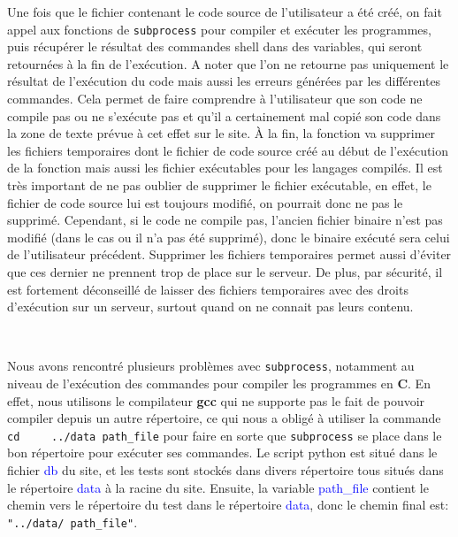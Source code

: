 \documentclass[a4paper]{article}
\renewcommand{\texttt}[2][blue]{\textcolor{#1}{\ttfamily #2}}
\begin{document}
  Une fois que le fichier contenant le code source de l'utilisateur a été créé,
  on fait appel aux fonctions de \lstinline{subprocess} pour compiler et
  exécuter les programmes, puis récupérer le résultat des commandes shell dans
  des variables, qui seront retournées à la fin de l'exécution. A noter que
  l'on ne retourne pas uniquement le résultat de l'exécution du code mais aussi
  les erreurs générées par les différentes commandes. Cela permet de faire
  comprendre à l'utilisateur que son code ne compile pas ou ne s'exécute pas et
  qu'il a certainement mal copié son code dans la zone de texte prévue à cet
  effet sur le site. À la fin, la fonction va supprimer les fichiers
  temporaires dont le fichier de code source créé au début de l'exécution de la
  fonction mais aussi les fichier exécutables pour les langages compilés. Il
  est très important de ne pas oublier de supprimer le fichier exécutable, en
  effet, le fichier de code source lui est toujours modifié, on pourrait donc
  ne pas le supprimé. Cependant, si le code ne compile pas, l'ancien fichier
  binaire n'est pas modifié (dans le cas ou il n'a pas été supprimé), donc le
  binaire exécuté sera celui de l'utilisateur précédent. Supprimer les fichiers
  temporaires permet aussi d'éviter que ces dernier ne prennent trop de place
  sur le serveur. De plus, par sécurité, il est fortement déconseillé de
  laisser des fichiers temporaires avec des droits d'exécution sur un serveur,
  surtout quand on ne connait pas leurs contenu.

  \\

  \begin{multicols}{2}
    Nous avons rencontré plusieurs problèmes avec \lstinline{subprocess},
    notamment au niveau de l'exécution des commandes pour compiler les
    programmes en \textbf{C}. En effet, nous utilisons le compilateur
    \textbf{gcc} qui ne supporte pas le fait de pouvoir compiler depuis un
    autre répertoire, ce qui nous a obligé à utiliser la commande \lstinline{cd
    ../data path_file} pour faire en sorte que \lstinline{subprocess} se place
    dans le bon répertoire pour exécuter ses commandes. Le script python est
    situé dans le fichier \texttt{db} du  site, et les tests sont stockés dans
    divers répertoire tous situés dans le répertoire \texttt{data} à la racine
    du site. Ensuite, la variable \texttt{path\_file} contient le chemin vers
    le répertoire du test dans le répertoire \texttt{data}, donc le chemin
    final est: \lstinline{"../data/ path_file"}.
  \end{multicols}
\end{document}
